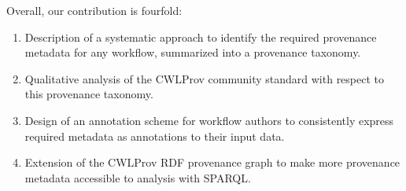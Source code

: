 
Overall, our contribution is fourfold:
\begin{enumerate}
    \item Description of a systematic approach to identify the required provenance metadata for any workflow, summarized into a provenance taxonomy.
    \item Qualitative analysis of the CWLProv community standard with respect to this provenance taxonomy.
    \item Design of an annotation scheme for workflow authors to consistently express required metadata as annotations to their input data.
    \item Extension of the CWLProv RDF provenance graph to make more provenance metadata accessible to analysis with SPARQL.
\end{enumerate}









